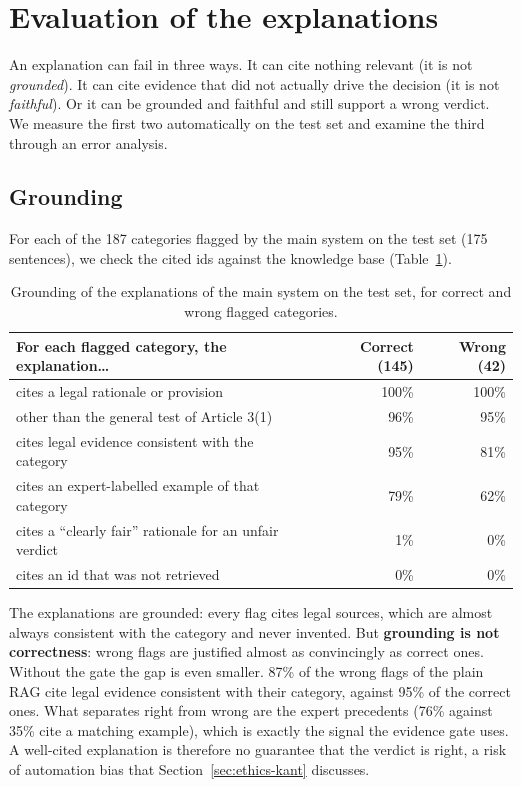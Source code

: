 \section{Evaluation of the explanations}
\label{sec:explanations}

An explanation can fail in three ways. It can cite nothing relevant (it is not \emph{grounded}). It can cite evidence that did not actually drive the decision (it is not \emph{faithful}). Or it can be grounded and faithful and still support a wrong verdict. We measure the first two automatically on the test set and examine the third through an error analysis.

\subsection{Grounding}

For each of the 187 categories flagged by the main system on the test set (175 sentences), we check the cited ids against the knowledge base (Table~\ref{tab:grounding}).

\begin{table}[ht]
\centering\small
\caption{Grounding of the explanations of the main system on the test set, for correct and wrong flagged categories.}
\label{tab:grounding}
\begin{tabular}{@{}lrr@{}}
\toprule
For each flagged category, the explanation\ldots & Correct (145) & Wrong (42) \\
\midrule
cites a legal rationale or provision & 100\% & 100\% \\
\quad other than the general test of Article 3(1) & 96\% & 95\% \\
cites legal evidence consistent with the category & 95\% & 81\% \\
cites an expert-labelled example of that category & 79\% & 62\% \\
cites a ``clearly fair'' rationale for an unfair verdict & 1\% & 0\% \\
cites an id that was not retrieved & 0\% & 0\% \\
\bottomrule
\end{tabular}
\end{table}

The explanations are grounded: every flag cites legal sources, which are almost always consistent with the category and never invented. But \textbf{grounding is not correctness}: wrong flags are justified almost as convincingly as correct ones. Without the gate the gap is even smaller. 87\% of the wrong flags of the plain RAG cite legal evidence consistent with their category, against 95\% of the correct ones. What separates right from wrong are the expert precedents (76\% against 35\% cite a matching example), which is exactly the signal the evidence gate uses. A well-cited explanation is therefore no guarantee that the verdict is right, a risk of automation bias that Section~\ref{sec:ethics-kant} discusses.

